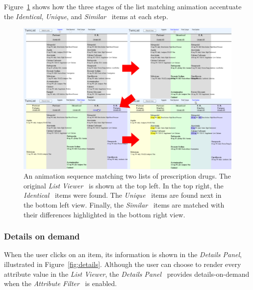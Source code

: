 \documentclass{chi2009}
\newcommand{\ListViewer}{\textit{List Viewer}}
\newcommand{\Details}{\textit{Details Panel}}
\newcommand{\Similar}{\textit{Similar}}
\newcommand{\Identical}{\textit{Identical}}
\newcommand{\Unique}{\textit{Unique}}
\newcommand{\AttributeFilter}{\textit{Attribute Filter}}
\begin{document}
Figure~\ref{fig:animation} shows how the three stages of the list matching animation accentuate the \Identical, \Unique, and \Similar~ items at each step.

\begin{figure}[t]
\begin{center}
\includegraphics[width=1\linewidth]{img/anim_arrows.png}
\end{center}
   \caption{An animation sequence matching two lists of prescription drugs. The original \ListViewer~ is shown at the top left. In the top right, the \Identical~ items were found. The \Unique~ items are found next in the bottom left view. Finally, the \Similar~ items are matched with their differences highlighted in the bottom right view.}
   \label{fig:animation}
\end{figure}

\subsubsection{Details on demand}
When the user clicks on an item, its information is shown in the \Details, illustrated in Figure~\ref{fig:details}. Although the user can choose to render every attribute value in the \ListViewer, the \Details~ provides details-on-demand when the \AttributeFilter~ is enabled.
\end{document}
